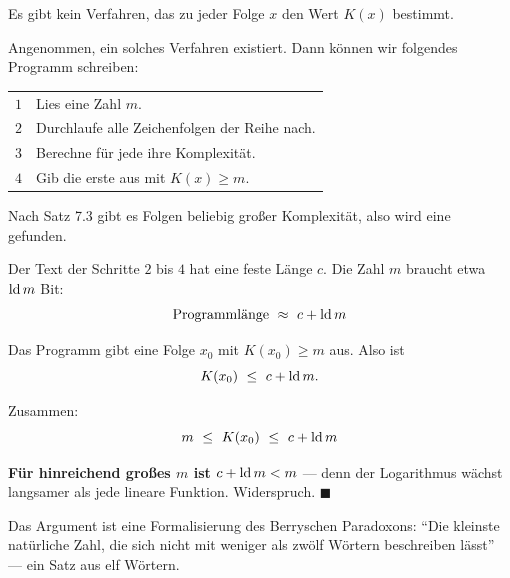 \begin{merksatz}
Es gibt kein Verfahren, das zu jeder Folge $x$ den Wert $K(x)$ bestimmt.

Angenommen, ein solches Verfahren existiert. Dann können wir folgendes Programm schreiben:

\begin{center}
{\small
\renewcommand{\arraystretch}{1.5}
\begin{tabular}{@{}P{1.0cm}P{7.4cm}@{}}
\toprule
$1$ & Lies eine Zahl $m$.\\
$2$ & Durchlaufe alle Zeichenfolgen der Reihe nach.\\
$3$ & Berechne für jede ihre Komplexität.\\
$4$ & Gib die erste aus mit $K(x) \ge m$.\\
\bottomrule
\end{tabular}}
\end{center}

Nach Satz 7.3 gibt es Folgen beliebig großer Komplexität, also wird eine gefunden.

Der Text der Schritte $2$ bis $4$ hat eine feste Länge $c$. Die Zahl $m$ braucht etwa $\operatorname{ld} m$ Bit:
\[ \text{Programmlänge} \ \approx\ c + \operatorname{ld} m \]

Das Programm gibt eine Folge $x_0$ mit $K(x_0) \ge m$ aus. Also ist
\[ K(x_0) \ \le\ c + \operatorname{ld} m . \]

Zusammen:
\[ m \ \le\ K(x_0) \ \le\ c + \operatorname{ld} m \]

\begin{center}
\begin{minipage}{0.9\textwidth}
\textbf{Für hinreichend großes $m$ ist $c + \operatorname{ld} m < m$} --- denn der Logarithmus wächst langsamer als jede lineare Funktion. Widerspruch. $\blacksquare$
\end{minipage}
\end{center}

\begin{center}
\begin{minipage}{0.88\textwidth}
\end{minipage}
\end{center}

Das Argument ist eine Formalisierung des Berryschen Paradoxons: \enquote{Die kleinste natürliche Zahl, die sich nicht mit weniger als zwölf Wörtern beschreiben lässt} --- ein Satz aus elf Wörtern.
\end{merksatz}

